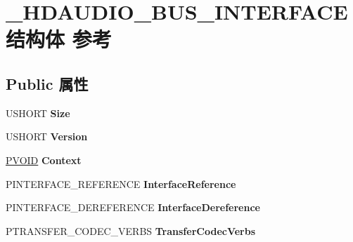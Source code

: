 \hypertarget{struct___h_d_a_u_d_i_o___b_u_s___i_n_t_e_r_f_a_c_e}{}\section{\+\_\+\+H\+D\+A\+U\+D\+I\+O\+\_\+\+B\+U\+S\+\_\+\+I\+N\+T\+E\+R\+F\+A\+C\+E结构体 参考}
\label{struct___h_d_a_u_d_i_o___b_u_s___i_n_t_e_r_f_a_c_e}
\subsection*{Public 属性}
\begin{DoxyCompactItemize}
\item 
\mbox{\label{struct___h_d_a_u_d_i_o___b_u_s___i_n_t_e_r_f_a_c_e_a6f6c303409dfd5c8de200ddcddc543f6}} 
U\+S\+H\+O\+RT {\bfseries Size}
\item 
\mbox{\label{struct___h_d_a_u_d_i_o___b_u_s___i_n_t_e_r_f_a_c_e_ad09be6d5e1a6fdfe4437b6d5c042fb04}} 
U\+S\+H\+O\+RT {\bfseries Version}
\item 
\mbox{\label{struct___h_d_a_u_d_i_o___b_u_s___i_n_t_e_r_f_a_c_e_a314b800924c0c1461935b1e0049f160d}} 
\hyperlink{interfacevoid}{P\+V\+O\+ID} {\bfseries Context}
\item 
\mbox{\label{struct___h_d_a_u_d_i_o___b_u_s___i_n_t_e_r_f_a_c_e_a928bd22b397efde58e3c47ca8e9fc940}} 
P\+I\+N\+T\+E\+R\+F\+A\+C\+E\+\_\+\+R\+E\+F\+E\+R\+E\+N\+CE {\bfseries Interface\+Reference}
\item 
\mbox{\label{struct___h_d_a_u_d_i_o___b_u_s___i_n_t_e_r_f_a_c_e_af8ecb1fb3083946db742637b29b9828f}} 
P\+I\+N\+T\+E\+R\+F\+A\+C\+E\+\_\+\+D\+E\+R\+E\+F\+E\+R\+E\+N\+CE {\bfseries Interface\+Dereference}
\item 
\mbox{\label{struct___h_d_a_u_d_i_o___b_u_s___i_n_t_e_r_f_a_c_e_a64f8a4720b3a767707820c230315b738}} 
P\+T\+R\+A\+N\+S\+F\+E\+R\+\_\+\+C\+O\+D\+E\+C\+\_\+\+V\+E\+R\+BS {\bfseries Transfer\+Codec\+Verbs}

\end{DoxyCompactItemize}
